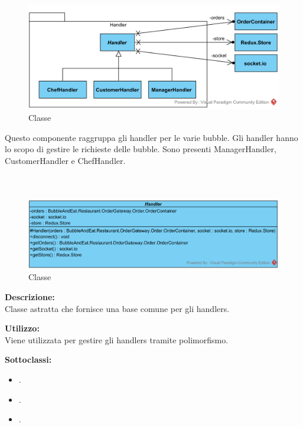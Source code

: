 \paragraph[::Handlers]{\class}\mbox{}\\ \label{\class}
\begin{figure}[H]
	\centering
		\includegraphics[width=15cm]{./diagrammi/demo/server/handlerpkg.png}
	\caption{Classe \class}
\end{figure}
Questo componente raggruppa gli handler per le varie bubble. Gli handler hanno lo scopo di gestire le richieste delle bubble. Sono presenti ManagerHandler, CustomerHandler e ChefHandler.

\subparagraph[::Handler]{\class}\mbox{}\\ \label{\class}
\begin{figure}[H]
	\centering
		\includegraphics[width=15cm]{./diagrammi/demo/server/handlers/handler.png}
	\caption{Classe \class}
\end{figure}
\textbf{Descrizione:}\\
Classe astratta che fornisce una base comune per gli handlers.

\textbf{Utilizzo:}\\
Viene utilizzata per gestire gli handlers tramite polimorfismo.

%
\textbf{Sottoclassi:}
\begin{itemize}
	\item {}.
	\item {}.
	\item {}.
\end{itemize}

